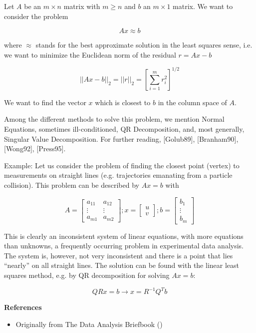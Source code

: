 \documentclass{article}
\begin{document}
Let $A$ be an $m \times n$ matrix with $m \ge n$  and $b$ an $m \times 1$ matrix. We want to consider the problem

$$ Ax \approx b $$

where $\approx$ stands for the best approximate solution in the least squares sense, i.e. we want to minimize the Euclidean norm of the residual $r = Ax - b$

$$ ||Ax-b||_2 = ||r||_2 = \left[\sum_{i=1}^m r_i^2 \right]^{1/2} $$

We want to find the vector $x$ which is closest to $b$ in the column space of $A$.

Among the different methods to solve this problem, we mention Normal Equations, sometimes ill-conditioned, QR Decomposition, and, most generally, Singular Value Decomposition. For further reading, [Golub89], [Branham90], [Wong92], [Press95].

Example: Let us consider the problem of finding the closest point (vertex) to measurements on straight lines (e.g. trajectories emanating from a particle collision). This problem can be described by $Ax = b$ with

$$ A = \begin{bmatrix}a_{11} & a_{12} \\ \vdots & \vdots \\ a_{m1} & a_{m2} \end{bmatrix} ; x = \begin{bmatrix}u \\ v \end{bmatrix} ;b = \begin{bmatrix} b_1 \\ \vdots \\ b_m \end{bmatrix} $$

This is clearly an inconsistent system of linear equations, with more equations than unknowns, a frequently occurring problem in experimental data analysis. The system is, however, not very inconsistent and there is a point that lies ``nearly'' on all straight lines. The solution can be found with the linear least squares method, e.g. by QR decomposition for solving $Ax = b$:

$$ QRx = b \rightarrow x = R^{-1}Q^Tb $$ 

{\bf References}

\begin{itemize}
\item Originally from The Data Analysis Briefbook
()
\end{itemize}
\end{document}
